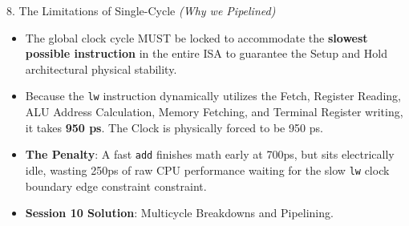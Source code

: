 \documentclass[aspectratio=169]{beamer}
\begin{document}
\begin{frame}{8. The Limitations of Single-Cycle \textit{(Why we Pipelined)}}
\begin{itemize}
    \item The global clock cycle MUST be locked to accommodate the \textbf{slowest possible instruction} in the entire ISA to guarantee the Setup and Hold architectural physical stability. 
    \item Because the \texttt{lw} instruction dynamically utilizes the Fetch, Register Reading, ALU Address Calculation, Memory Fetching, and Terminal Register writing, it takes \textbf{950 ps}. The Clock is physically forced to be 950 ps.
    \item \textbf{The Penalty}: A fast \texttt{add} finishes math early at 700ps, but sits electrically idle, wasting 250ps of raw CPU performance waiting for the slow \texttt{lw} clock boundary edge constraint constraint.
    \item \textbf{Session 10 Solution}: Multicycle Breakdowns and Pipelining.
\end{itemize}
\end{frame}
\end{document}
